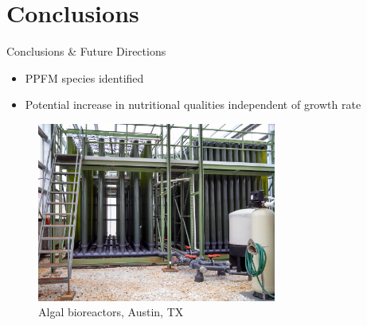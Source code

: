 \documentclass[8pt]{beamer}\usepackage[]{graphicx}\usepackage[]{color}
\begin{document}
\section{Conclusions}
\begin{frame}{Conclusions \& Future Directions}
\begin{itemize}
\item PPFM species identified
\item Potential increase in nutritional qualities independent of growth rate
\end{itemize}

\begin{figure}
                                \includegraphics[width=0.7\textwidth]{./figure/UTEXAlgalBioreactors.jpg}
                                \caption{Algal bioreactors, Austin, TX}
                                \end{figure}

\end{frame}
%
\end{document}
